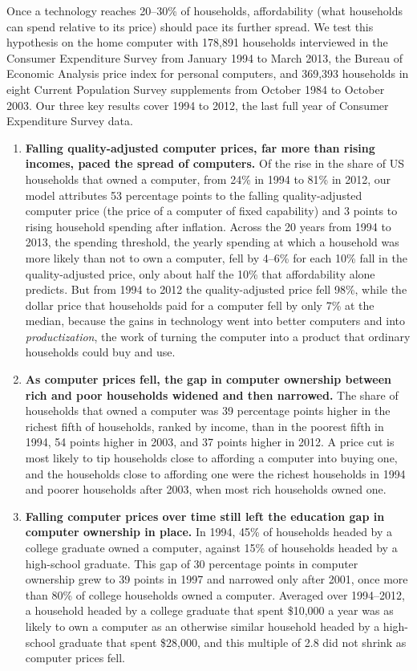\documentclass[11pt]{article}
\begin{document}
\noindent Once a technology reaches 20--30\% of households, affordability (what households can spend relative to its price) should pace its further spread. We test this hypothesis on the home computer with 178{,}891 households interviewed in the Consumer Expenditure Survey from January 1994 to March 2013, the Bureau of Economic Analysis price index for personal computers, and 369{,}393 households in eight Current Population Survey supplements from October 1984 to October 2003. Our three key results cover 1994 to 2012, the last full year of Consumer Expenditure Survey data.
\begin{enumerate}\setlength{\itemsep}{1pt}
\item \textbf{Falling quality-adjusted computer prices, far more than rising incomes, paced the spread of computers.} Of the rise in the share of US households that owned a computer, from 24\% in 1994 to 81\% in 2012, our model attributes 53 percentage points to the falling quality-adjusted computer price (the price of a computer of fixed capability) and 3 points to rising household spending after inflation. Across the 20 years from 1994 to 2013, the spending threshold, the yearly spending at which a household was more likely than not to own a computer, fell by 4--6\% for each 10\% fall in the quality-adjusted price, only about half the 10\% that affordability alone predicts. But from 1994 to 2012 the quality-adjusted price fell 98\%, while the dollar price that households paid for a computer fell by only 7\% at the median, because the gains in technology went into better computers and into \emph{productization}, the work of turning the computer into a product that ordinary households could buy and use.
\item \textbf{As computer prices fell, the gap in computer ownership between rich and poor households widened and then narrowed.} The share of households that owned a computer was 39 percentage points higher in the richest fifth of households, ranked by income, than in the poorest fifth in 1994, 54 points higher in 2003, and 37 points higher in 2012. A price cut is most likely to tip households close to affording a computer into buying one, and the households close to affording one were the richest households in 1994 and poorer households after 2003, when most rich households owned one.
\item \textbf{Falling computer prices over time still left the education gap in computer ownership in place.} In 1994, 45\% of households headed by a college graduate owned a computer, against 15\% of households headed by a high-school graduate. This gap of 30 percentage points in computer ownership grew to 39 points in 1997 and narrowed only after 2001, once more than 80\% of college households owned a computer. Averaged over 1994--2012, a household headed by a college graduate that spent \$10{,}000 a year was as likely to own a computer as an otherwise similar household headed by a high-school graduate that spent \$28{,}000, and this multiple of 2.8 did not shrink as computer prices fell.
\end{enumerate}
\end{document}
